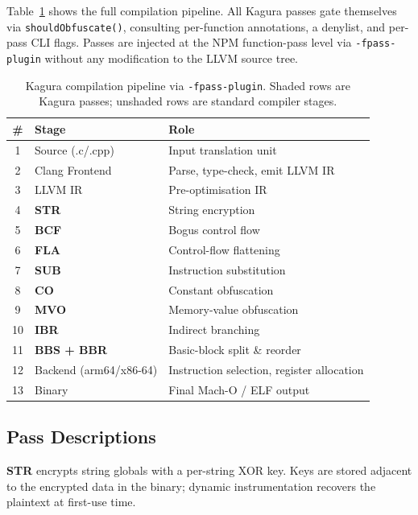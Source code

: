 \documentclass[conference]{IEEEtran}
\begin{document}
Table~\ref{tab:pipeline} shows the full compilation pipeline.
All Kagura passes gate themselves via \texttt{shouldObfuscate()}, consulting
per-function annotations, a denylist, and per-pass CLI flags.
Passes are injected at the NPM function-pass level via \texttt{-fpass-plugin}
without any modification to the LLVM source tree.

\begin{table}[t]
\centering
\caption{Kagura compilation pipeline via \texttt{-fpass-plugin}.
  Shaded rows are Kagura passes; unshaded rows are standard compiler stages.}
\label{tab:pipeline}
\footnotesize
\begin{tabular}{clp{4.2cm}}
\toprule
\# & Stage & Role \\
\midrule
1 & Source (.c/.cpp)        & Input translation unit \\
2 & Clang Frontend          & Parse, type-check, emit LLVM IR \\
3 & LLVM IR                 & Pre-optimisation IR \\
\rowcolor{blue!10}
4 & \textbf{STR}            & String encryption \\
\rowcolor{blue!10}
5 & \textbf{BCF}            & Bogus control flow \\
\rowcolor{blue!10}
6 & \textbf{FLA}            & Control-flow flattening \\
\rowcolor{blue!10}
7 & \textbf{SUB}            & Instruction substitution \\
\rowcolor{blue!10}
8 & \textbf{CO}             & Constant obfuscation \\
\rowcolor{blue!10}
9 & \textbf{MVO}            & Memory-value obfuscation \\
\rowcolor{blue!10}
10 & \textbf{IBR}           & Indirect branching \\
\rowcolor{blue!10}
11 & \textbf{BBS + BBR}     & Basic-block split \& reorder \\
12 & Backend (arm64/x86-64) & Instruction selection, register allocation \\
13 & Binary                 & Final Mach-O / ELF output \\
\bottomrule
\end{tabular}
\end{table}

\subsection{Pass Descriptions}

\textbf{STR} encrypts string globals with a per-string XOR key.
Keys are stored adjacent to the encrypted data in the binary;
dynamic instrumentation recovers the plaintext at first-use time.
\end{document}

